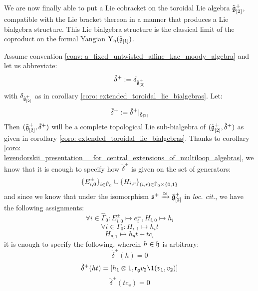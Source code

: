             We are now finally able to put a Lie cobracket on the toroidal Lie algebra $\tilde{\mathfrak{g}}_{[2]}^+$, compatible with the Lie bracket thereon in a manner that produces a Lie bialgebra structure. This Lie bialgebra structure is the classical limit of the coproduct on the formal Yangian $\mathrm{Y}_{\mathfrak{h}}(\hat{\mathfrak{g}}_{[1]})$. 
            \begin{lemma} \label{lemma: toroidal_lie_bialgebras}
                Assume convention \ref{conv: a_fixed_untwisted_affine_kac_moody_algebra} and let us abbreviate:
                    $$\hat{\delta}^+ := \delta_{\hat{\mathfrak{g}}_{[2]}^+}$$
                with $\delta_{\hat{\mathfrak{g}}_{[2]}^+}$ as in corollary \ref{coro: extended_toroidal_lie_bialgebras}. Let:
                    $$\tilde{\delta}^+ := \hat{\delta}^+|_{\tilde{\mathfrak{g}}_{[2]}}$$
                Then $(\tilde{\mathfrak{g}}_{[2]}^+, \tilde{\delta}^+)$ will be a complete topological Lie sub-bialgebra of $(\hat{\mathfrak{g}}_{[2]}^+, \hat{\delta}^+)$ as given in corollary \ref{coro: extended_toroidal_lie_bialgebras}. Thanks to corollary \ref{coro: levendorskii_presentation__for_central_extensions_of_multiloop_algebras}, we know that it is enough to specify how $\tilde{\delta}^+$ is given on the set of generators:
                    $$\{E_{i, 0}^{\pm}\}_{i \in \hat{\Gamma}_0} \cup \{H_{i, r}\}_{ (i, r) \in \hat{\Gamma}_0 \x \{0, 1\} }$$
                and since we know that under the isomorphism $\mathfrak{s}^+ \xrightarrow[]{\simeq} \tilde{\mathfrak{g}}_{[2]}^+$ in \textit{loc. cit.}, we have the following assignments:
                    $$\forall i \in \hat{\Gamma}_0: E_{i, 0}^{\pm} \mapsto e_i^{\pm}, H_{i, 0} \mapsto h_i$$
                    $$\forall i \in \Gamma_0: H_{i, 1} \mapsto h_i t$$
                    $$H_{\theta, 1} \mapsto h_{\theta} t + t c_v$$
                it is enough to specify the following, wherein $h \in \mathfrak{h}$ is arbitrary:
                    $$\tilde{\delta}^+(h) = 0$$
                    $$\tilde{\delta}^+(ht) = [h_1 \tensor 1, \sfr_{\g} v_2 \1(v_1, v_2)]$$
                    $$\tilde{\delta}^+(t c_v) = 0$$
            \end{lemma}
